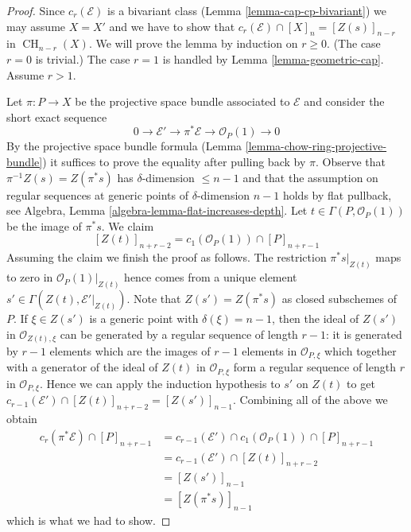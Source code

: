 \documentclass[10pt,a4paper]{amsart}
\theoremstyle{plain}
\theoremstyle{definition}
\theoremstyle{remark}
\numberwithin{equation}{subsection}
\def\CH{\mathop{\mathrm{CH}}\nolimits}
\begin{document}
\begin{proof}
Since $c_r(\mathcal{E})$ is a bivariant class
(Lemma \ref{lemma-cap-cp-bivariant})
we may assume $X = X'$ and we have to show that
$c_r(\mathcal{E}) \cap [X]_n = [Z(s)]_{n - r}$ in $\CH_{n - r}(X)$.
We will prove the lemma by induction on $r \geq 0$. (The case
$r = 0$ is trivial.) The case $r = 1$
is handled by Lemma \ref{lemma-geometric-cap}. Assume $r > 1$.

\medskip\noindent
Let $\pi : P \to X$ be the projective space bundle associated to
$\mathcal{E}$ and consider the short exact sequence
$$
0 \to \mathcal{E}' \to \pi^*\mathcal{E} \to \mathcal{O}_P(1) \to 0
$$
By the projective space bundle formula
(Lemma \ref{lemma-chow-ring-projective-bundle})
it suffices to prove the equality after pulling back by $\pi$.
Observe that $\pi^{-1}Z(s) = Z(\pi^*s)$ has $\delta$-dimension
$\leq n - 1$ and that the assumption on regular sequences at
generic points of $\delta$-dimension $n - 1$ holds by
flat pullback, see
Algebra, Lemma \ref{algebra-lemma-flat-increases-depth}.
Let $t \in \Gamma(P, \mathcal{O}_P(1))$ be the image of $\pi^*s$.
We claim
$$
[Z(t)]_{n + r - 2} = c_1(\mathcal{O}_P(1)) \cap [P]_{n + r - 1}
$$
Assuming the claim we finish the proof as follows.
The restriction $\pi^*s|_{Z(t)}$ maps to zero in
$\mathcal{O}_P(1)|_{Z(t)}$ hence comes from a unique
element $s' \in \Gamma(Z(t), \mathcal{E}'|_{Z(t)})$.
Note that $Z(s') = Z(\pi^*s)$ as closed subschemes of $P$.
If $\xi \in Z(s')$ is a generic point with $\delta(\xi) = n - 1$,
then the ideal of $Z(s')$ in $\mathcal{O}_{Z(t), \xi}$
can be generated by a regular sequence of length $r - 1$: it is generated by
$r - 1$ elements which are the images of $r - 1$ elements in
$\mathcal{O}_{P, \xi}$ which together with a generator of the
ideal of $Z(t)$ in $\mathcal{O}_{P, \xi}$ form a regular sequence
of length $r$ in $\mathcal{O}_{P, \xi}$. Hence we can apply the
induction hypothesis to $s'$ on $Z(t)$ to get
$c_{r - 1}(\mathcal{E}') \cap [Z(t)]_{n + r - 2} = [Z(s')]_{n - 1}$.
Combining all of the above we obtain
\begin{align*}
c_r(\pi^*\mathcal{E}) \cap [P]_{n + r - 1}
& =
c_{r - 1}(\mathcal{E}') \cap c_1(\mathcal{O}_P(1)) \cap [P]_{n + r - 1} \\
& =
c_{r - 1}(\mathcal{E}') \cap [Z(t)]_{n + r - 2} \\
& =
[Z(s')]_{n - 1} \\
& = [Z(\pi^*s)]_{n - 1}
\end{align*}
which is what we had to show.


\end{proof}
\end{document}
